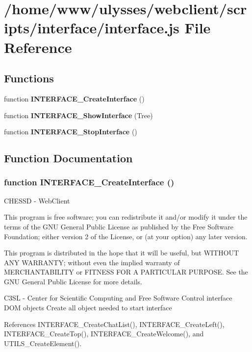 \section{/home/www/ulysses/webclient/scripts/interface/interface.js File Reference}
\label{interface_8js}
\subsection*{Functions}
\begin{CompactItemize}
\item 
function {\bf INTERFACE\_\-CreateInterface} ()
\item 
function {\bf INTERFACE\_\-ShowInterface} (Tree)
\item 
function {\bf INTERFACE\_\-StopInterface} ()
\end{CompactItemize}


\subsection{Function Documentation}
\subsubsection{\setlength{\rightskip}{0pt plus 5cm}function INTERFACE\_\-CreateInterface ()}\label{interface_8js_ecaef5274c46c0a69d1f326629fcd66a}


CHESSD - WebClient

This program is free software; you can redistribute it and/or modify it under the terms of the GNU General Public License as published by the Free Software Foundation; either version 2 of the License, or (at your option) any later version.

This program is distributed in the hope that it will be useful, but WITHOUT ANY WARRANTY; without even the implied warranty of MERCHANTABILITY or FITNESS FOR A PARTICULAR PURPOSE. See the GNU General Public License for more details.

C3SL - Center for Scientific Computing and Free Software Control interface DOM objects Create all object needed to start interface 

References INTERFACE\_\-CreateChatList(), INTERFACE\_\-CreateLeft(), INTERFACE\_\-CreateTop(), INTERFACE\_\-CreateWelcome(), and UTILS\_\-CreateElement().

